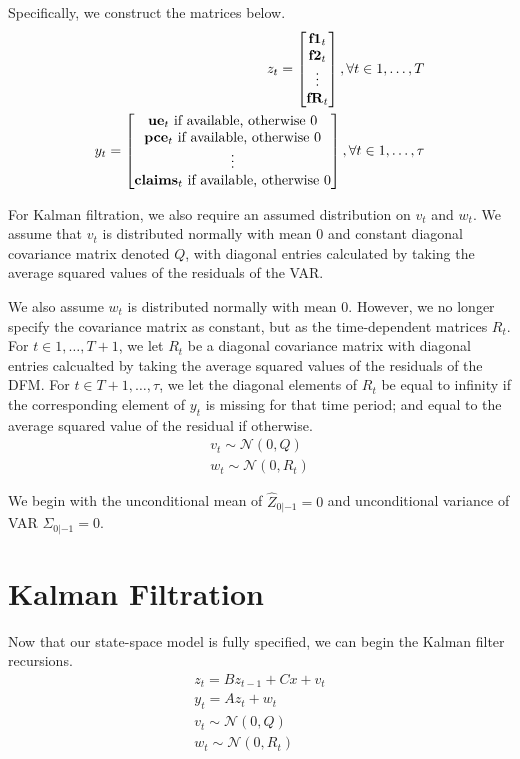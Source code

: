 \documentclass[11pt, letterpaper]{article}
\newcommand{\vv}[1]{\textcolor{black}{\mathbf{#1}}}
\begin{document}
Specifically, we construct the matrices below.
\begin{align*}
z_t
=
\begin{bmatrix}
	\vv{f1}_{t}\\
	\vv{f2}_{t}\\
	\vdots \\
	\vv{fR}_{t}
\end{bmatrix}, \forall t \in 1, \dots, T\\
y_t
=
\begin{bmatrix}
	\text{$\vv{ue}_{t}$ if available, otherwise 0}\\
	\text{$\vv{pce}_{t}$ if available, otherwise 0}\\
	\vdots \\
	\text{$\vv{claims}_{t}$ if available, otherwise 0}\\
\end{bmatrix}, \forall t \in 1, \dots, \tau
\end{align*}

For Kalman filtration, we also require an assumed distribution on $v_t$ and $w_t$. We assume that $v_t$ is distributed normally with mean 0 and constant diagonal covariance matrix denoted $Q$, with diagonal entries calculated by taking the average squared values of the residuals of the VAR.

We also assume $w_t$ is distributed normally with mean $0$. However, we no longer specify the covariance matrix as constant, but as the time-dependent matrices $R_t$. For $t \in 1, \dots, T+1$, we let $R_t$ be a diagonal covariance matrix with diagonal entries calcualted by taking the average squared values of the residuals of the DFM. For $t \in T+1, \dots, \tau$, we let the diagonal elements of $R_t$ be equal to infinity if the corresponding element of $y_t$ is missing for that time period; and equal to the average squared value of the residual if otherwise.
\begin{align*}
	v_t \sim \mathcal{N}(0, Q)\\
	w_t \sim \mathcal{N}(0, R_t)
\end{align*}

We begin with the unconditional mean of $\widehat{Z}_{0|-1} = 0$ and unconditional variance of VAR $\Sigma_{0|-1} = 0$.

\section{Kalman Filtration}
Now that our state-space model is fully specified, we can begin the Kalman filter recursions.
\begin{align*}
	z_t = B z_{t-1} + Cx + v_t\\
	y_t = A z_t + w_t\\
	v_t \sim \mathcal{N}(0, Q)\\
	w_t \sim \mathcal{N}(0, R_t)
\end{align*}
\end{document}

